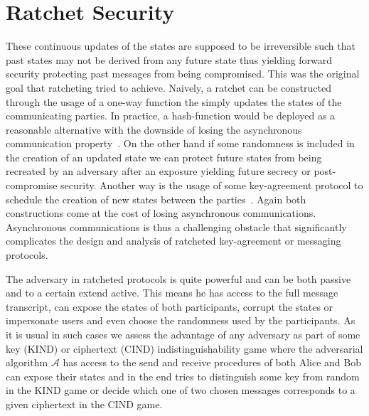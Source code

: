 \documentclass[11pt,a4paper,twoside,openright,bibliography=totoc]{scrbook}
\begin{document}
\section{Ratchet Security}
\label{sec:ratchet-security}

These continuous updates of the states are supposed to be irreversible
such that past states may not be derived from any future state thus
yielding forward security protecting past messages from being
compromised. This was the original goal that ratcheting tried to
achieve. Naively, a ratchet can be constructed through the usage of a
one-way function the simply updates the states of the communicating
parties. In practice, a hash-function would be deployed as a
reasonable alternative with the downside of losing the asynchronous
communication property~\cite{bellare2003forward}. On the other hand if
some randomness is included in the creation of an updated state we can
protect future states from being recreated by an adversary after an
exposure yielding future secrecy or post-compromise security. Another
way is the usage of some key-agreement protocol to schedule the
creation of new states between the parties~\cite{cohn2016post}.  Again
both constructions come at the cost of losing asynchronous
communications. Asynchronous communications is thus a challenging
obstacle that significantly complicates the design and analysis
of ratcheted key-agreement or messaging protocols.

\bigskip

The adversary in ratcheted protocols is quite powerful and can be both
passive and to a certain extend active. This means he has access to
the full message transcript, can expose the states of both
participants, corrupt the states or impersonate users and even choose
the randomness used by the participants. As it is usual in such cases
we assess the advantage of any adversary as part of some key (KIND) or
ciphertext (CIND) indistinguishability game where the adversarial
algorithm $\mathcal{A}$ has access to the send and receive procedures
of both Alice and Bob can expose their states and in the end tries to
distinguish some key from random in the KIND game or decide
which one of two chosen messages corresponds to a given ciphertext
in the CIND game.
\end{document}
